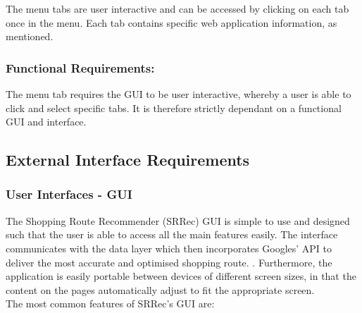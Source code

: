 \documentclass[10pt,twocolumn]{witseiepaper}
\begin{document}
		The menu tabs are user interactive and can be accessed by clicking on each tab once in the menu. Each tab contains specific web application information, as mentioned. 
		
		\subsubsection*{Functional Requirements:}
		
		The menu tab requires the GUI to be user interactive, whereby a user is able to click and select specific tabs. It is therefore strictly dependant on a functional GUI and interface.
		
		
		\subsection{External Interface Requirements}
		
		\subsubsection{User Interfaces - GUI}
		
		The Shopping Route Recommender (SRRec) GUI is simple to use and designed such that the user is able to access all the main features easily. The interface communicates with the data layer which then incorporates Googles' API to deliver the most accurate and optimised shopping route. . Furthermore, the application is easily portable between devices of different screen sizes, in that the content on the pages automatically adjust to fit the appropriate screen.\\
		
		The most common features of SRRec's GUI are:
		
\end{document}

